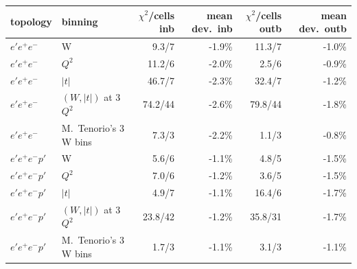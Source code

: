 \begin{tabular}{llrrrr}\toprule
topology & binning & $\chi^2$/cells inb & mean dev.\ inb & $\chi^2$/cells outb & mean dev.\ outb \\\midrule
$e'e^+e^-$ & W & 9.3/7 & -1.9\% & 11.3/7 & -1.0\% \\
$e'e^+e^-$ & $Q^2$ & 11.2/6 & -2.0\% & 2.5/6 & -0.9\% \\
$e'e^+e^-$ & $|t|$ & 46.7/7 & -2.3\% & 32.4/7 & -1.2\% \\
$e'e^+e^-$ & $(W,|t|)$ at 3 $Q^2$ & 74.2/44 & -2.6\% & 79.8/44 & -1.8\% \\
$e'e^+e^-$ & M.~Tenorio's 3 W bins & 7.3/3 & -2.2\% & 1.1/3 & -0.8\% \\
\midrule
$e'e^+e^-p'$ & W & 5.6/6 & -1.1\% & 4.8/5 & -1.5\% \\
$e'e^+e^-p'$ & $Q^2$ & 7.0/6 & -1.2\% & 3.6/5 & -1.5\% \\
$e'e^+e^-p'$ & $|t|$ & 4.9/7 & -1.1\% & 16.4/6 & -1.7\% \\
$e'e^+e^-p'$ & $(W,|t|)$ at 3 $Q^2$ & 23.8/42 & -1.2\% & 35.8/31 & -1.7\% \\
$e'e^+e^-p'$ & M.~Tenorio's 3 W bins & 1.7/3 & -1.1\% & 3.1/3 & -1.1\% \\
\bottomrule\end{tabular}
